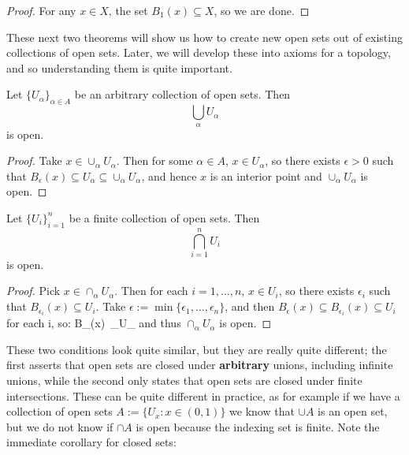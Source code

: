 	\begin{proof} 
		For any $x\in X$, the set $B_1(x)\subseteq X$, so we are done.
	\end{proof}
	
	These next two theorems will show us how to create new open sets out of existing collections of open sets. Later, we will develop these into axioms for 
	a topology, and so understanding them is quite important.
	
	\begin{theorem}
	Let $\{U_\alpha\}_{\alpha\in A}$ be an arbitrary collection of open sets. Then
	\begin{equation}
		\bigcup_\alpha U_\alpha
	\end{equation}
	is open.
	\end{theorem}
	
	\begin{proof}
		Take $x\in \cup_\alpha U_\alpha$. Then for some $\alpha\in A$, $x\in U_\alpha$, so there exists $\epsilon > 0$ such that $B_\epsilon(x)\subseteq 
		U_\alpha\subseteq \cup_\alpha U_\alpha$, and hence $x$ is an interior point and $\cup_\alpha U_\alpha$ is open.
	\end{proof}
	
	\begin{theorem}
	Let $\{U_i\}_{i = 1}^n$ be a finite collection of open sets. Then 
	\begin{equation}
		\bigcap_{i = 1}^n U_i
	\end{equation}
	is open.
	\end{theorem}
	
	\begin{proof}
		Pick $x\in\cap_\alpha U_\alpha$. Then for each $i = 1, ..., n$, $x\in U_i$, so there exists $\epsilon_i$ such that $B_{\epsilon_i}(x)\subseteq U_i$. Take 
		$\epsilon := \min \{\epsilon_1, ..., \epsilon_n\}$, and then $B_\epsilon(x)\subseteq B_{\epsilon_i}(x)\subseteq U_i$ for each i, so:
		\eq
			B_\epsilon(x)\subseteq\, \bigcap_\alpha U_\alpha
		\qe
		and thus $\cap_\alpha U_\alpha$ is open.
	\end{proof}
	
	These two conditions look quite similar, but they are really quite different; the first asserts that open sets are closed under \textbf{arbitrary} unions, including 
	infinite unions, while the second only states that open sets are closed under finite intersections. These can be quite different in practice, as for example if 
	we have a collection of open sets $A := \{U_x : x\in (0, 1)\}$ we know that $\cup A$ is an open set, but we do not know if $\cap A$ is open because the 
	indexing set is finite. Note the immediate corollary for closed sets:
	
